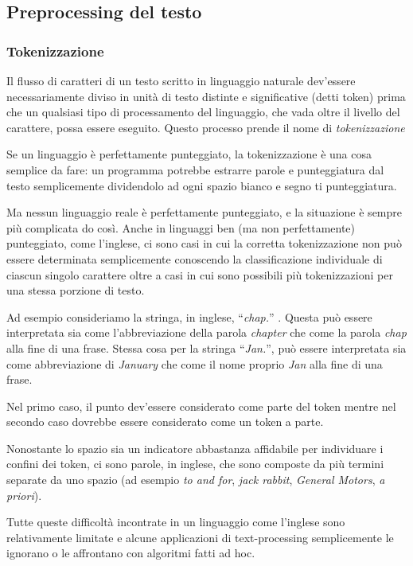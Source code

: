 \subsection{Preprocessing del testo}

\subsubsection{Tokenizzazione}
Il flusso di caratteri di un testo scritto in linguaggio naturale dev'essere necessariamente diviso in unit\`a di testo distinte e significative (detti token) prima che un qualsiasi tipo di processamento del linguaggio, che vada oltre il livello del carattere, possa essere eseguito.
Questo processo prende il nome di \emph{tokenizzazione}

Se un linguaggio \`e perfettamente punteggiato, la tokenizzazione \`e una cosa semplice da fare: un programma potrebbe estrarre parole e punteggiatura dal testo semplicemente dividendolo ad ogni spazio bianco e segno ti punteggiatura.

Ma nessun linguaggio reale \`e perfettamente punteggiato, e la situazione \`e sempre pi\`u complicata do cos\`i.
Anche in linguaggi ben (ma non perfettamente) punteggiato, come l'inglese, ci sono casi in cui la corretta tokenizzazione non pu\`o essere determinata semplicemente conoscendo la classificazione individuale di ciascun singolo carattere oltre a casi in cui sono possibili pi\`u tokenizzazioni per una stessa porzione di testo.

Ad esempio consideriamo la stringa, in inglese, ``\emph{chap.}'' .
Questa pu\`o essere interpretata sia come l'abbreviazione della parola \emph{chapter} che come la parola \emph{chap} alla fine di una frase.
Stessa cosa per la stringa ``\emph{Jan.}'', pu\`o essere interpretata sia come abbreviazione di \emph{January} che come il nome proprio \emph{Jan} alla fine di una frase.

Nel primo caso, il punto dev'essere considerato come parte del token mentre nel secondo caso dovrebbe essere considerato come un token a parte.

Nonostante lo spazio sia un indicatore abbastanza affidabile per individuare i confini dei token, ci sono parole, in inglese, che sono composte da pi\`u termini separate da uno spazio (ad esempio \emph{to and for}, \emph{jack rabbit}, \emph{General Motors}, \emph{a priori}).

Tutte queste difficolt\`a incontrate in un linguaggio come l'inglese sono relativamente limitate e alcune applicazioni di text-processing semplicemente le ignorano o le affrontano con algoritmi fatti ad hoc.

